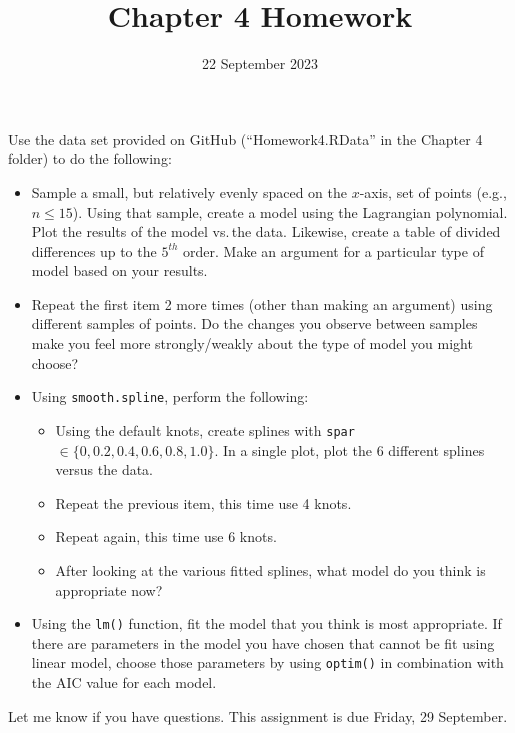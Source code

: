 \documentclass{article}
\title{Chapter 4 Homework}
\date{22 September 2023}
\begin{document}
\maketitle

Use the data set provided on GitHub (``Homework4.RData'' in the Chapter 4 folder) to do the following: 

\begin{itemize}
    \item Sample a small, but relatively evenly spaced on the $x$-axis, set of points (e.g., $n\le15$). Using that sample, create a model using the Lagrangian polynomial. Plot the results of the model vs.\,the data. Likewise, create a table of divided differences up to the $5^{th}$ order. Make an argument for a particular type of model based on your results. 
    \item Repeat the first item 2 more times (other than making an argument) using different samples of points. Do the changes you observe between samples make you feel more strongly/weakly about the type of model you might choose?
    \item Using \texttt{smooth.spline}, perform the following:
    \begin{itemize}
        \item Using the default knots, create splines with \texttt{spar} $\in \{0,0.2,0.4,0.6,0.8,1.0\}$. In a single plot, plot the 6 different splines versus the data.
        \item Repeat the previous item, this time use 4 knots.
        \item Repeat again, this time use 6 knots.
        \item After looking at the various fitted splines, what model do you think is appropriate now?
    \end{itemize}
    \item Using the \texttt{lm()} function, fit the model that you think is most appropriate. If there are parameters in the model you have chosen that cannot be fit using linear model, choose those parameters by using \texttt{optim()} in combination with the AIC value for each model.
\end{itemize}


Let me know if you have questions. This assignment is due Friday, 29 September. 
\end{document}
